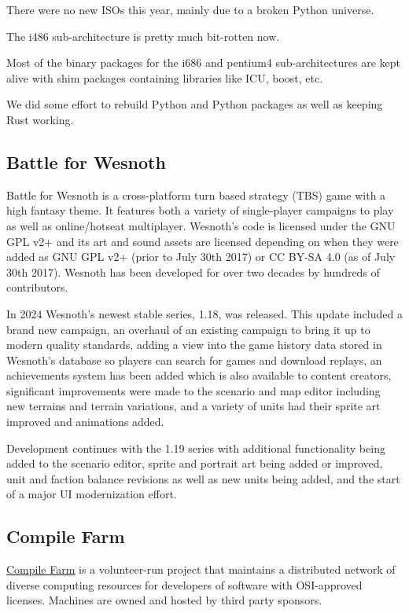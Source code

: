 \documentclass[a4paper]{report}
\begin{document}
There were no new ISOs this year, mainly due to a broken Python universe.

The i486 sub-architecture is pretty much bit-rotten now.

Most of the binary packages for the i686 and  pentium4 sub-architectures are kept alive with shim packages containing libraries like ICU, boost, etc.

We did some effort to rebuild Python and Python packages as well as keeping Rust working.

\subsection{Battle for Wesnoth}

Battle for Wesnoth is a cross-platform turn based strategy (TBS) game with a high fantasy theme. It features both a variety of single-player campaigns to play as well as online/hotseat multiplayer. Wesnoth's code is licensed under the GNU GPL v2+ and its art and sound assets are licensed depending on when they were added as GNU GPL v2+ (prior to July 30th 2017) or CC BY-SA 4.0 (as of July 30th 2017). Wesnoth has been developed for over two decades by hundreds of contributors.

In 2024 Wesnoth's newest stable series, 1.18, was released. This update included a brand new campaign, an overhaul of an existing campaign to bring it up to modern quality standards, adding a view into the game history data stored in Wesnoth's database so players can search for games and download replays, an achievements system has been added which is also available to content creators, significant improvements were made to the scenario and map editor including new terrains and terrain variations, and a variety of units had their sprite art improved and animations added.

Development continues with the 1.19 series with additional functionality being added to the scenario editor, sprite and portrait art being added or improved, unit and faction balance revisions as well as new units being added, and the start of a major UI modernization effort.

\subsection{Compile Farm}

\href{https://portal.cfarm.net/}{Compile Farm} is a volunteer-run project that maintains a distributed network of diverse computing resources for developers of software with OSI-approved licenses. Machines are owned and hosted by third party sponsors.
\end{document}
